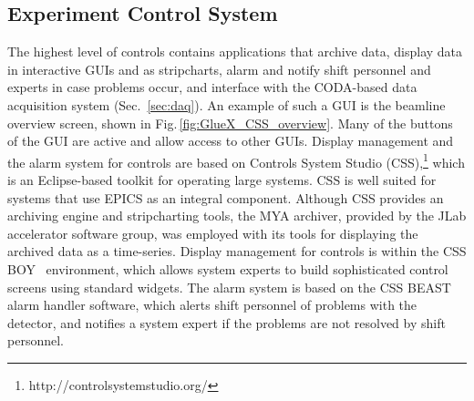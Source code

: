 \subsection{Experiment Control System \label{sec:alarms}}
The highest level of controls contains applications that archive data, display data in interactive GUIs and as stripcharts, alarm and notify shift personnel and experts in case problems occur, and interface with the CODA-based data acquisition system (Sec.~\ref{sec:daq}).
An example of such a GUI is the beamline overview screen, shown in Fig.\,\ref{fig:GlueX_CSS_overview}. Many of the buttons of the GUI are active and allow access to other GUIs.
Display management and the alarm system for \gx{} controls are based on Controls System Studio (CSS),\footnote{http://controlsystemstudio.org/}  which is an Eclipse-based toolkit for operating large systems. CSS is well suited for systems that use EPICS as an integral component. Although CSS provides an archiving engine and stripcharting tools, the MYA archiver,\cite{Slominski:2009icaleps} provided by the JLab accelerator software group, was employed with its tools for displaying the archived data as a time-series. Display management for \gx{} controls is within the CSS BOY~\cite{Chen:2011icaleps} environment, which allows system experts to build sophisticated control screens using standard widgets. The alarm system is based on the CSS BEAST\cite{Kasemir:2009icaleps} alarm handler software, which alerts shift personnel of problems with the detector, and notifies a system expert if the problems are not resolved by shift personnel. 